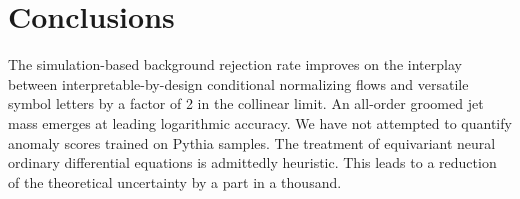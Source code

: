 \section{Conclusions}\label{sec:conclusions}

The simulation-based background rejection rate improves on the interplay
between interpretable-by-design conditional normalizing flows and
versatile symbol letters by a factor of 2 in the collinear limit. An
all-order groomed jet mass emerges at leading logarithmic accuracy. We
have not attempted to quantify anomaly scores trained on Pythia samples.
The treatment of equivariant neural ordinary differential equations is
admittedly heuristic. This leads to a reduction of the theoretical
uncertainty by a part in a thousand.

